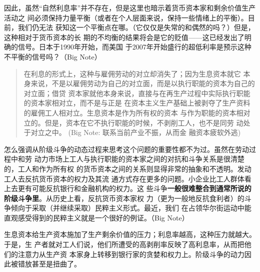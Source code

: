 因此，虽然“自然利息率”并不存在，但是这里也暗示着货币资本家和剩余价值生产活动之
间必须保持力量平衡（或者在个人层面来说，保持一些情绪上的平衡）。目前，我们仍无法
获知这一个平衡点在哪。（它仅仅是失常的和偶然的吗？）但是，这种相对于货币资本的长
期的不均衡的结果将会是它的贬值——这已经发出了明确的信号。日本于1990年开始，而美国
于2007年开始盛行的超低利率是预示这种不平衡的信号吗？（Big Note）

\begin{quotation}在利息的形式上，这种与雇佣劳动的对立却消失了；因为生息资本就它
本身来说，不是以雇佣劳动为自己的对立面，而是以执行职能的资本为自己的对立面；借贷
资本家就他本身来说，直接与在再生产过程中实际执行职能的资本家相对立，而不是与正是
在资本主义生产基础上被剥夺了生产资料的雇佣工人相对立。生息资本是作为所有权的资本
与作为职能的资本相对立的。但是，资本在它不执行职能的时候，不剥削工人，也不是同劳
动处于对立之中。 (Big Note: 联系当前产业不振，从而金
融资本疲软外逃)

\end{quotation}

怎么强调从阶级斗争的动态过程来思考这个问题的重要性都不为过。虽然在劳动过程中和劳
动力市场上工人与执行职能的资本家之间的对抗和斗争关系是很清楚的，工人和作为所有权
的货币资本之间的关系则显得非常的抽象和不透明。发动工人去反抗货币资本的权力及其流
通方式存在更多的问题。小企业比工人群体看上去更有可能反抗银行和金融机构的权力。这
些斗争\textbf{一般很难整合到通常所说的阶级斗争里}。从历史上看，反抗货币资本家权
力（更为一般地反抗食利者）的斗争倾向于采取（并继续采取）民粹主义形式。最近，我们
在占领华尔街运动中能直观感受得到的民粹主义就是一个很好的例证。（Big Note）

生息资本给生产资本施加了生产剩余价值的压力；利息率越高，这种压力就越大。于是，生
产者就对工人们说，他们所遭受的高剥削率反映了高利息率，从而把他们的注意力从生产资
本家身上转移到银行家的贪婪和权力上。阶级斗争的动力因此被错放甚至是扭曲了。

